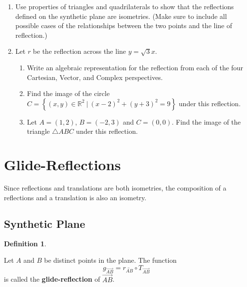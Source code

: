 \documentclass[
]{book}
\providecommand{\tightlist}{%
  \setlength{\itemsep}{0pt}\setlength{\parskip}{0pt}}
\theoremstyle{definition}
\newtheorem{definition}{Definition}[chapter]
\theoremstyle{definition}
\theoremstyle{definition}
\theoremstyle{definition}
\theoremstyle{remark}
\begin{document}
\begin{enumerate}
\def\labelenumi{\arabic{enumi}.}
\item
  Use properties of triangles and quadrilaterals to show that the reflections defined on the synthetic plane are isometries. (Make sure to include all possible cases of the relationships between the two points and the line of reflection.)
\item
  Let \(r\) be the reflection across the line \(y=\sqrt{3}x\).

  \begin{enumerate}
  \def\labelenumii{\alph{enumii}.}
  \tightlist
  \item
    Write an algebraic representation for the reflection from each of the four Cartesian, Vector, and Complex perspectives.
  \item
    Find the image of the circle \(C=\left\{ (x,y)\in \mathbb{R}^2 \: \vert \: (x-2)^2+(y+3)^2 =9\right\}\) under this reflection.
  \item
    Let \(A=(1,2)\), \(B=(-2,3)\) and \(C=(0,0)\). Find the image of the triangle \(\triangle ABC\) under this reflection.
  \end{enumerate}
\end{enumerate}

\hypertarget{glide-reflections}{%
\section{Glide-Reflections}\label{glide-reflections}}

Since reflections and translations are both isometries, the composition of a reflections and a translation is also an isometry.

\hypertarget{synthetic-plane-4}{%
\subsection{Synthetic Plane}\label{synthetic-plane-4}}

\begin{definition}
\protect\hypertarget{def:unlabeled-div-280}{}\label{def:unlabeled-div-280}

Let \(A\) and \(B\) be distinct points in the plane. The function \[g_{\overrightarrow{AB}} = r_{\overleftrightarrow{AB}} \circ T_{\overrightarrow{AB}}\] is called the \textbf{glide-reflection} of \(\overrightarrow{AB}\).

\end{definition}
\end{document}
